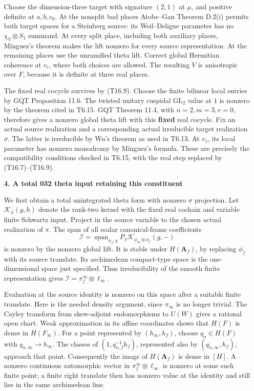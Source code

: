 \documentclass[11pt,a4paper]{article}
\theoremstyle{definition}
\begin{document}
Choose the dimension-three target with signature \((2,1)\) at \(\mu\), and positive definite at \(a,b,c_0\). At the nonsplit bad places Atobe--Gan Theorem D.2(i) permits both target spaces for a Steinberg source: its Weil--Deligne parameter has no \(\chi_V\otimes S_1\) summand. At every split place, including both auxiliary places, Mínguez's theorem makes the lift nonzero for every source representation. At the remaining places use the unramified theta lift. Correct global Hermitian coherence at \(v_i\), where both choices are allowed. The resulting \(V\) is anisotropic over \(F\), because it is definite at three real places.

The fixed real cocycle survives by (T16.9). Choose the finite bilinear local entries by GQT Proposition 11.6. The twisted unitary cuspidal \(\mathrm{GL}_2\) value at \(1\) is nonzero by the theorem cited in T6.15. GQT Theorem 11.4, with \(n=2,m=3,r=0\), therefore gives a nonzero global theta lift with this \textbf{fixed} real cocycle. Fix an actual source realization and a corresponding actual irreducible target realization \(\sigma\). The latter is irreducible by Wu's theorem as used in T6.13. At \(v_s\), its local parameter has nonzero monodromy by Mínguez's formula. These are precisely the compatibility conditions checked in T6.15, with the real step replaced by (T16.7)--(T16.9).

\textbf{4. A total 032 theta input retaining this constituent}

We first obtain a total unintegrated theta form with nonzero \(\sigma\) projection. Let \(\mathcal K_{\phi}(g,h)\) denote the rank-two kernel with the fixed real cochain and variable finite Schwartz input. Project in the source variable to the chosen actual realization of \(\pi\). The span of all scalar canonical-frame coefficients \[
\mathcal I=\operatorname{span}_{\phi_f,g}
 P_\pi\mathcal K_{\phi_\infty\otimes\phi_f}(g,-)
\tag{T16.10}
\] is nonzero by the nonzero global lift. It is stable under \(H(\mathbf A_f)\), by replacing \(\phi_f\) with its source translate. Its archimedean compact-type space is the one-dimensional space just specified. Thus irreducibility of the smooth finite representation gives \(\mathcal I=\pi_f^\infty\otimes\ell_\infty\).

Evaluation at the source identity is nonzero on this space after a suitable finite translate. Here is the needed density argument, since \(\pi_\infty\) is no longer trivial. The Cayley transform from skew-adjoint endomorphisms to \(U(W)\) gives a rational open chart. Weak approximation in its affine coordinates shows that \(H(F)\) is dense in \(H(F_\infty)\). For a point represented by \((h_\infty,h_f)\), choose \(q_n\in H(F)\) with \(q_{n,\infty}\to h_\infty\). The classes of \((1,q_{n,f}^{-1}h_f)\), represented also by \((q_{n,\infty},h_f)\), approach that point. Consequently the image of \(H(\mathbf A_f)\) is dense in \([H]\). A nonzero continuous automorphic vector in \(\pi_f^\infty\otimes\ell_\infty\) is nonzero at some such finite point; a finite right translate then has nonzero value at the identity and still lies in the same archimedean line.
\end{document}
